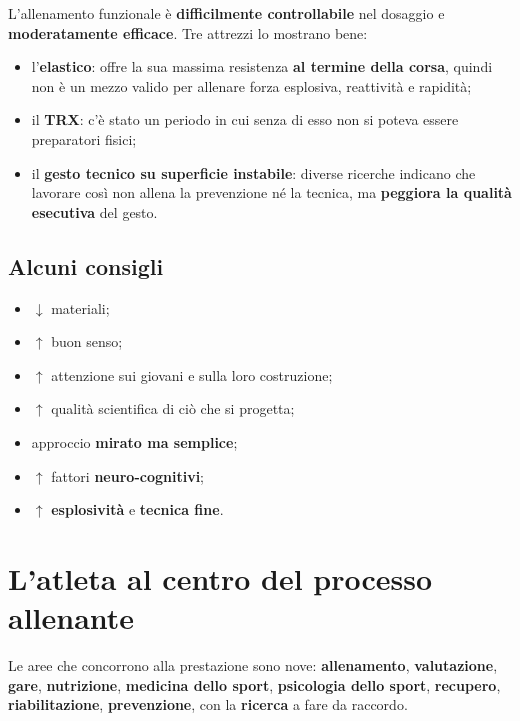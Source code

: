 L'allenamento funzionale è \textbf{difficilmente controllabile} nel dosaggio e
\textbf{moderatamente efficace}. Tre attrezzi lo mostrano bene:

\begin{itemize}
  \item l'\textbf{elastico}: offre la sua massima resistenza \textbf{al termine della corsa}, quindi
    non è un mezzo valido per allenare forza esplosiva, reattività e rapidità;
  \item il \textbf{TRX}: c'è stato un periodo in cui senza di esso non si poteva essere preparatori
    fisici;
  \item il \textbf{gesto tecnico su superficie instabile}: diverse ricerche indicano che lavorare
    così non allena la prevenzione né la tecnica, ma \textbf{peggiora la qualità esecutiva} del
    gesto.
\end{itemize}

\subsection{Alcuni consigli}

\begin{itemize}
  \item $\downarrow$ materiali;
  \item $\uparrow$ buon senso;
  \item $\uparrow$ attenzione sui giovani e sulla loro costruzione;
  \item $\uparrow$ qualità scientifica di ciò che si progetta;
  \item approccio \textbf{mirato ma semplice};
  \item $\uparrow$ fattori \textbf{neuro-cognitivi};
  \item $\uparrow$ \textbf{esplosività} e \textbf{tecnica fine}.
\end{itemize}

\section{L'atleta al centro del processo allenante}

Le aree che concorrono alla prestazione sono nove: \textbf{allenamento}, \textbf{valutazione},
\textbf{gare}, \textbf{nutrizione}, \textbf{medicina dello sport}, \textbf{psicologia dello sport},
\textbf{recupero}, \textbf{riabilitazione}, \textbf{prevenzione}, con la \textbf{ricerca} a fare da
raccordo.

